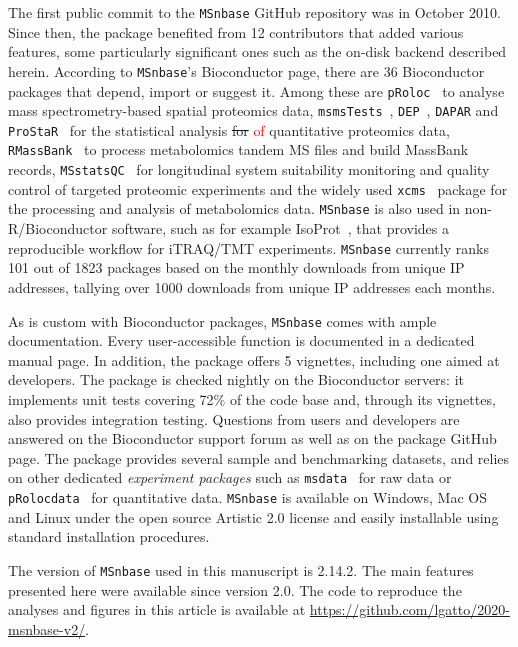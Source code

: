 \documentclass[journal=jacsat,manuscript=article]{achemso}\usepackage[]{graphicx}\usepackage[]{color}
\begin{document}
The first public commit to the \texttt{MSnbase} GitHub repository was
in October 2010. Since then, the package benefited from 12
contributors\cite{contribs} that added various features, some
particularly significant ones such as the on-disk backend described
herein. According to \texttt{MSnbase}'s Bioconductor page, there are
36 Bioconductor packages that depend, import or suggest it. Among
these are \texttt{pRoloc}~\cite{Gatto:2014a} to analyse mass
spectrometry-based spatial proteomics data,
\texttt{msmsTests}~\cite{msmsTests}, \texttt{DEP}~\cite{Zhang:2018},
\texttt{DAPAR} and \texttt{ProStaR}~\cite{Wieczorek:2017} for the
statistical analysis \sout{for} \textcolor{red}{of} quantitative
proteomics data, \texttt{RMassBank}~\cite{Stravs:2013} to process
metabolomics tandem MS files and build MassBank records,
\texttt{MSstatsQC}~\cite{Dogu:2017} for longitudinal system
suitability monitoring and quality control of targeted proteomic
experiments and the widely used \texttt{xcms}~\cite{Smith:2006}
package for the processing and analysis of metabolomics
data. \texttt{MSnbase} is also used in non-R/Bioconductor software,
such as for example IsoProt~\cite{Griss:2019}, that provides a
reproducible workflow for iTRAQ/TMT experiments. \texttt{MSnbase}
currently ranks 101 out of 1823 packages based on the monthly
downloads from unique IP addresses, tallying over 1000 downloads from
unique IP addresses each months.

As is custom with Bioconductor packages, \texttt{MSnbase} comes with
ample documentation. Every user-accessible function is documented in a
dedicated manual page. In addition, the package offers 5 vignettes,
including one aimed at developers. The package is checked nightly on
the Bioconductor servers: it implements unit tests covering 72\% of
the code base and, through its vignettes, also provides integration
testing. Questions from users and developers are answered on the
Bioconductor support forum as well as on the package GitHub page. The
package provides several sample and benchmarking datasets, and relies
on other dedicated \textit{experiment packages} such as
\texttt{msdata}~\cite{msdata} for raw data or
\texttt{pRolocdata}~\cite{Gatto:2014a} for quantitative
data. \texttt{MSnbase} is available on Windows, Mac OS and Linux under
the open source Artistic 2.0 license and easily installable using
standard installation procedures.




The version of \texttt{MSnbase} used in this manuscript is
2.14.2. The main features presented here were available since
version 2.0. The code to reproduce the analyses and figures in this
article is available at
\url{https://github.com/lgatto/2020-msnbase-v2/}.
\end{document}
